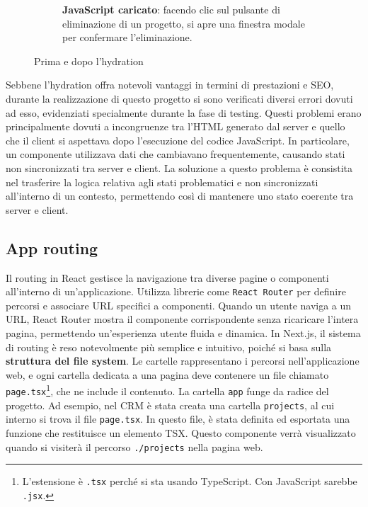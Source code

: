 \documentclass[target=bach,aauheader=,style=]{thud}
\begin{document}
\begin{figure}[H]
\begin{subfigure}[b]{0.46\textwidth}
        \caption{\textbf{JavaScript caricato}: facendo clic sul pulsante di eliminazione di un progetto, si apre una finestra modale per confermare l'eliminazione.}
        \label{fig:img2}
    \end{subfigure}
    \caption{Prima e dopo l'hydration}
    \label{fig:two_images}
\end{figure}

\label{sec:hydration_error}
\noindent Sebbene l'hydration offra notevoli vantaggi in termini di prestazioni e SEO, durante la realizzazione di questo progetto si sono verificati diversi errori dovuti ad esso, evidenziati specialmente durante la fase di testing. Questi problemi erano principalmente dovuti a incongruenze tra l'HTML generato dal server e quello che il client si aspettava dopo l'esecuzione del codice JavaScript. In particolare, un componente utilizzava dati che cambiavano frequentemente, causando stati non sincronizzati tra server e client. La soluzione a questo problema è consistita nel trasferire la logica relativa agli stati problematici e non sincronizzati all'interno di un contesto, permettendo così di mantenere uno stato coerente tra server e client.

\subsection{App routing}
Il routing in React gestisce la navigazione tra diverse pagine o componenti all'interno di un'applicazione. Utilizza librerie come \texttt{React Router} per definire percorsi e associare URL specifici a componenti. Quando un utente naviga a un URL, React Router mostra il componente corrispondente senza ricaricare l'intera pagina, permettendo un'esperienza utente fluida e dinamica. In Next.js, il sistema di routing è reso notevolmente più semplice e intuitivo, poiché si basa sulla \textbf{struttura del file system}. Le cartelle rappresentano i percorsi nell'applicazione web, e ogni cartella dedicata a una pagina deve contenere un file chiamato \texttt{page.tsx}\footnote{L'estensione è \texttt{.tsx} perché si sta usando TypeScript. Con JavaScript sarebbe \texttt{.jsx}.}, che ne include il contenuto. La cartella \texttt{app} funge da radice del progetto. Ad esempio, nel CRM è stata creata una cartella \texttt{projects}, al cui interno si trova il file \texttt{page.tsx}. In questo file, è stata definita ed esportata una funzione che restituisce un elemento TSX. Questo componente verrà visualizzato quando si visiterà il percorso \texttt{./projects} nella pagina web.
\end{document}
